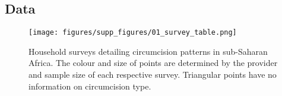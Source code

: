\documentclass{article}
\begin{document}
\begin{appendix}


\newpage

\tableofcontents

\newpage


\section{Data}


\begin{figure}[!hbtp]
    \centering
    \texttt{[image: figures/supp\_figures/01\_survey\_table.png]}
    \caption{Household surveys detailing circumcision patterns in sub-Saharan Africa. The colour and size of points are determined by the provider and sample size of each respective survey. Triangular points have no information on circumcision type.}
    \label{fig:surveys}
\end{figure}

\begin{landscape}

\end{landscape}


\end{appendix}
\end{document}
